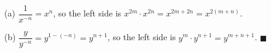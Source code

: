 (a) $\dfrac1{x^{-n}}=x^n$, so the left side is $x^{2m}\cdot x^{2n}=x^{2m+2n}=x^{2(m+n)}$.

(b) $\dfrac{y}{y^{-n}}=y^{1-(-n)}=y^{n+1}$, so the left side is $y^m\cdot y^{n+1}=y^{m+n+1}$. $\blacksquare$
